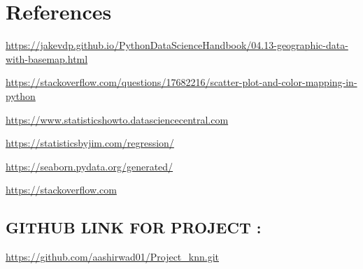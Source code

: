 \section{References}

\begin{block}
\color{gray}

\url{https://jakevdp.github.io/PythonDataScienceHandbook/04.13-geographic-data-with-basemap.html}

\url{https://stackoverflow.com/questions/17682216/scatter-plot-and-color-mapping-in-python}

\url{https://www.statisticshowto.datasciencecentral.com}

\url{https://statisticsbyjim.com/regression/}

\url{https://seaborn.pydata.org/generated/}

\url{https://stackoverflow.com}

\subsection{GITHUB LINK FOR PROJECT :}
\url{https://github.com/aashirwad01/Project_knn.git}

\end{block}
